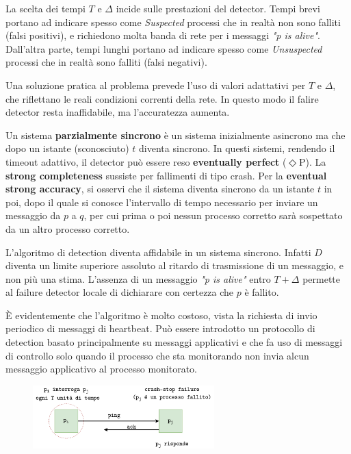 \vspace{5mm}

La scelta dei tempi $T$ e $\Delta$ incide sulle prestazioni del detector. Tempi brevi portano ad indicare spesso come \textit{Suspected} processi che in realtà non sono falliti (falsi positivi), e richiedono molta banda di rete per i messaggi \textit{"p is alive"}. Dall'altra parte, tempi lunghi portano ad indicare spesso come \textit{Unsuspected} processi che in realtà sono falliti (falsi negativi). 

Una soluzione pratica al problema prevede l'uso di valori adattativi per $T$ e $\Delta$, che riflettano le reali condizioni correnti della rete. In questo modo il falire detector resta inaffidabile, ma l'accuratezza aumenta. 

\vspace{5mm}

Un sistema \textbf{parzialmente sincrono} è un sistema inizialmente asincrono ma che dopo un istante (sconosciuto) $t$ diventa sincrono. In questi sistemi, rendendo il timeout adattivo, il detector può essere reso \textbf{eventually perfect} ($\Diamond$P). La \textbf{strong completeness} sussiste per fallimenti di tipo crash. Per la \textbf{eventual strong accuracy}, si osservi che il sistema diventa sincrono da un istante $t$ in poi, dopo il quale si conosce l'intervallo di tempo necessario per inviare un messaggio da $p$ a $q$, per cui prima o poi nessun processo corretto sarà sospettato da un altro processo corretto.

\vspace{5mm}
L'algoritmo di detection diventa affidabile in un sistema sincrono. Infatti $D$ diventa un limite superiore assoluto al ritardo di trasmissione di un messaggio, e non più una stima. L'assenza di un messaggio \textit{"p is alive"} entro $T + \Delta$ permette al failure detector locale di dichiarare con certezza che $p$ è fallito.

È evidentemente che l'algoritmo è molto costoso, vista la richiesta di invio periodico di messaggi di heartbeat. Può essere introdotto un protocollo di detection basato principalmente su messaggi applicativi e che fa uso di messaggi di controllo solo quando il processo che sta monitorando non invia alcun messaggio applicativo al processo monitorato.

\begin{figure}[ht]
    \centering
    \includegraphics[width=7cm]{./Images/cap2/2.20.png}
\end{figure}

